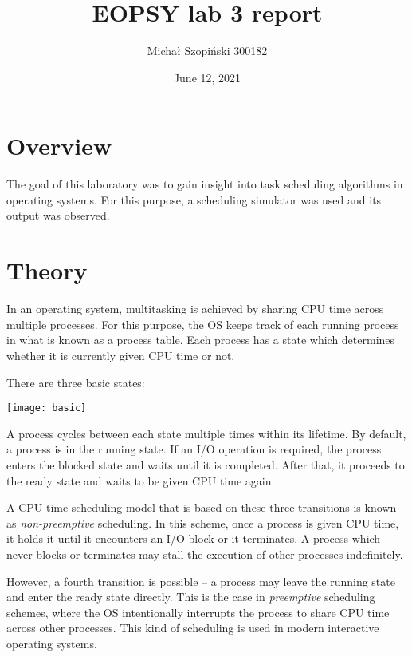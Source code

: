 \documentclass{article}
\begin{document}
    \title{EOPSY lab 3 report}
    \author{Michał Szopiński 300182}
    \date{June 12, 2021}
    \maketitle
    
    \section{Overview}
    
    The goal of this laboratory was to gain insight into task scheduling
    algorithms in operating systems. For this purpose, a scheduling simulator
    was used and its output was observed.
    
    \section{Theory}
    
    In an operating system, multitasking is achieved by sharing CPU time across
    multiple processes. For this purpose, the OS keeps track of each running
	process in what is known as a process table. Each process has a state
	which determines whether it is currently given CPU time or not.
	
	There are three basic states:
	
	\begin{center}
		\texttt{[image: basic]}
	\end{center}
	
	A process cycles between each state multiple times within its lifetime. By
	default, a process is in the running state. If an I/O operation is
	required, the process enters the blocked state and waits until it is
	completed. After that, it proceeds to the ready state and waits to be given
	CPU time again.
	
	A CPU time scheduling model that is based on these three transitions is
	known as \textit{non-preemptive} scheduling. In this scheme, once a process
	is given CPU time, it holds it until it encounters an I/O block or it
	terminates. A process which never blocks or terminates may stall the
	execution of other processes indefinitely.
	
	However, a fourth transition is possible -- a process may leave the running
	state and enter the ready state directly. This is the case in
	\textit{preemptive} scheduling schemes, where the OS intentionally
	interrupts the process to share CPU time across other processes. This kind
	of scheduling is used in modern interactive operating systems.
    
\end{document}
